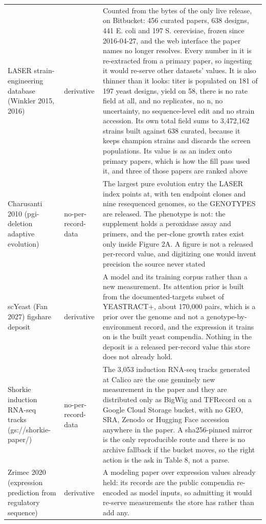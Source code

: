 \begin{longtable}{@{}L{58mm} L{26mm} L{88mm}@{}}
\addlinespace[5pt]
LASER strain-engineering database (Winkler 2015, 2016) & derivative & Counted from the bytes of the only live release, on Bitbucket: 456 curated papers, 638 designs, 441 E. coli and 197 S. cerevisiae, frozen since 2016-04-27, and the web interface the paper names no longer resolves. Every number in it is re-extracted from a primary paper, so ingesting it would re-serve other datasets' values. It is also thinner than it looks: titer is populated on 181 of 197 yeast designs, yield on 58, there is no rate field at all, and no replicates, no n, no uncertainty, no sequence-level edit and no strain accession. Its own total field sums to 3,472,162 strains built against 638 curated, because it keeps champion strains and discards the screen populations. Its value is as an index onto primary papers, which is how the fill pass used it, and three of those papers are ranked above \\
\addlinespace[5pt]
Charusanti 2010 (pgi-deletion adaptive evolution) & no-per-record-data & The largest pure evolution entry the LASER index points at, with ten endpoint clones and nine resequenced genomes, so the GENOTYPES are released. The phenotype is not: the supplement holds a peroxidase assay and primers, and the per-clone growth rates exist only inside Figure 2A. A figure is not a released per-record value, and digitizing one would invent precision the source never stated \\
\addlinespace[5pt]
scYeast (Fan 2027) figshare deposit & derivative & A model and its training corpus rather than a new measurement. Its attention prior is built from the documented-targets subset of YEASTRACT+, about 170,000 pairs, which is a prior over the genome and not a genotype-by-environment record, and the expression it trains on is the built yeast compendia. Nothing in the deposit is a released per-record value this store does not already hold. \\
\addlinespace[5pt]
Shorkie induction RNA-seq tracks (gs://shorkie-paper/) & no-per-record-data & The 3,053 induction RNA-seq tracks generated at Calico are the one genuinely new measurement in the paper and they are distributed only as BigWig and TFRecord on a Google Cloud Storage bucket, with no GEO, SRA, Zenodo or Hugging Face accession anywhere in the paper. A sha256-pinned mirror is the only reproducible route and there is no archive fallback if the bucket moves, so the right action is the ask in Table 8, not a parse. \\
\addlinespace[5pt]
Zrimec 2020 (expression prediction from regulatory sequence) & derivative & A modeling paper over expression values already held: its records are the public compendia re-encoded as model inputs, so admitting it would re-serve measurements the store has rather than add any. \\

\end{longtable}
